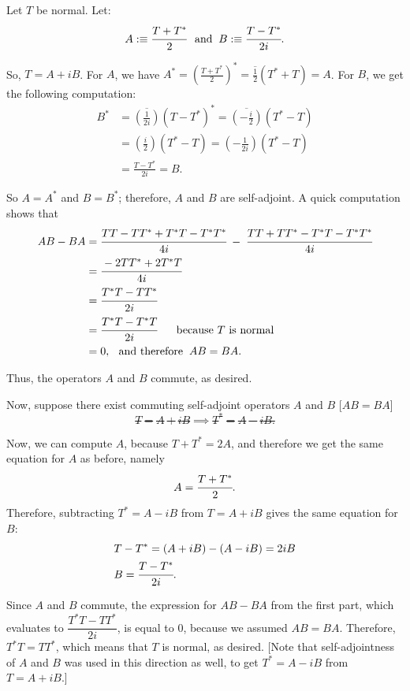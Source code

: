 \begin{prf}
  \Rightarrowdirection Let $T$ be normal. Let:
  \[
    A :\equiv \cfrac{T+T^*}{2} \;\;\, \text{and}\;\; B :\equiv \cfrac{T-T^*}{2i}.
  \]

  So, $T=A+iB$. For $A$, we have $A^* = \left(\frac{T+T^*}{2}\right)^* = \overline{\frac{1}{2}} (T^*+T) = A$. For $B$, we get the following computation:
  \[
    \begin{aligned}
      B^*
      &= \overline{\left(\tfrac{1}{2i}\right)} (T-T^*)^*
      = \overline{\left(-\tfrac{i}{2}\right)} (T^*-T) \\
      &= \left(\tfrac{i}{2}\right) (T^*-T)
      = \left(-\tfrac{1}{2i}\right) (T^*-T) \\
      &= \tfrac{T-T^*}{2i} = B.
    \end{aligned}
  \]

  So $A=A^*$ and $B=B^*$; therefore, $A$ and $B$ are self-adjoint. A quick computation shows that
  \[
  \begin{aligned}
    AB-BA
    &= \cfrac{TT-TT^*+T^*T-T^*T^*}{4i}
    \;-\;
    \cfrac{TT+TT^*-T^*T-T^*T^*}{4i} \\
    &= \cfrac{-2 TT^* + 2 T^*T}{4i} \\
    &= \cfrac{T^*T - TT^*}{2i}  \\
    &= \cfrac{T^*T - T^*T}{2i} \quad \;\;\, \text{because $T$ is normal}\;\; \\
    &= 0, \;\;\, \text{and therefore}\;\; AB = BA.
  \end{aligned}
  \]

  Thus, the operators $A$ and $B$ commute, as desired.

  \Leftarrowdirection Now, suppose there exist commuting self-adjoint operators $A$ and $B$ [$AB=BA$] \st
  \[
    T=A+iB \implies T^* = A-iB.
  \]

  Now, we can compute $A$, because $T+T^* = 2A$, and therefore we get the same equation for $A$ as before, namely
  \[
    A=\cfrac{T+T^*}{2}.
  \]
  Therefore, subtracting $T^* = A - iB$ from $T = A + iB$ gives the same equation for $B$:
  \[
  \begin{aligned}
    &T - T^* = (A+iB)-(A-iB) = 2iB \\
    &B=\cfrac{T-T^*}{2i}.
  \end{aligned}
  \]

  Since $A$ and $B$ commute, the expression for $AB-BA$ from the first part, which evaluates to $\dfrac{T^*T - TT^*}{2i}$, is equal to $0$, because we assumed $AB=BA$. Therefore, $T^*T=TT^*$, which means that $T$ is normal, as desired. [Note that self-adjointness of $A$ and $B$ was used in this direction as well, to get $T^* = A - iB$ from $T = A+iB$.]
\end{prf}